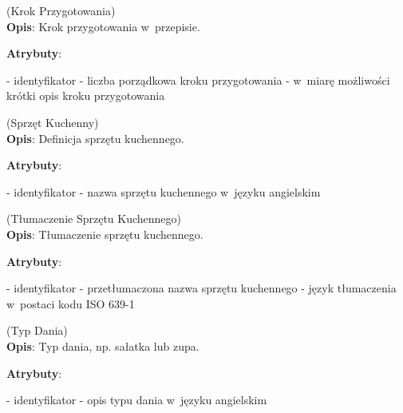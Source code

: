 \begin{enumerate}[label={\textbf{KAT/3/\protect\twodigits{\theenumi}}}, wide, labelwidth=!, labelindent=0pt, labelsep=0pt, series=reqs]
    \label{kat:PreparationStep} (Krok Przygotowania)\\
    \indent\textbf{Opis}: Krok przygotowania w~przepisie.
    \par
    \textbf{Atrybuty}:
    \begin{itemize}[series=atr, wide, align=left, leftmargin=190pt]
        \label{kat:PreparationStep:id}- identyfikator
        \label{kat:PreparationStep:ordinalNumber}- liczba porządkowa kroku przygotowania
        \label{kat:PreparationStep:stepDescription}- w~miarę możliwości krótki opis kroku przygotowania
    \end{itemize}

    \label{kat:KitchenAppliance} (Sprzęt Kuchenny)\\
    \indent\textbf{Opis}: Definicja sprzętu kuchennego.
    \par
    \textbf{Atrybuty}:
    \begin{itemize}[series=atr, wide, align=left, leftmargin=190pt]
        \label{kat:KitchenAppliance:id}- identyfikator
        \label{kat:KitchenAppliance:name}- nazwa sprzętu kuchennego w~języku angielskim
    \end{itemize}

    \label{kat:KitchenApplianceTranslation} (Tłumaczenie Sprzętu Kuchennego)\\
    \indent\textbf{Opis}: Tłumaczenie sprzętu kuchennego.
    \par
    \textbf{Atrybuty}:
    \begin{itemize}[series=atr, wide, align=left, leftmargin=190pt]
        \label{kat:KitchenApplianceTranslation:id}- identyfikator
        \label{kat:KitchenApplianceTranslation:translation}- przetłumaczona nazwa sprzętu kuchennego
        \label{kat:KitchenApplianceTranslation:language}- język tłumaczenia w~postaci kodu ISO 639-1
    \end{itemize}

    \label{kat:DishType} (Typ Dania)\\
    \indent\textbf{Opis}: Typ dania, np. sałatka lub zupa.
    \par
    \textbf{Atrybuty}:
    \begin{itemize}[series=atr, wide, align=left, leftmargin=190pt]
        \label{kat:DishType:id}- identyfikator
        \label{kat:DishType:description}- opis typu dania w~języku angielskim
    \end{itemize}


\end{enumerate}
